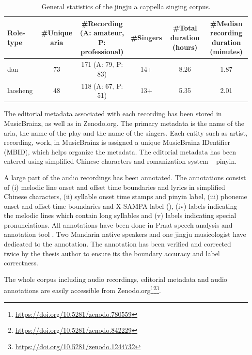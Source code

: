 \begin{landscape}
\mbox{}\vfill
\begin{table}[ht]
    \centering
    \caption{General statistics of the jingju a cappella singing corpus.}
    \label{table:ch4:general_statistics_jingju_a_cappella_corpus}
    \begin{tabular}{l|ccccc}
        \toprule
        Role-type & \#Unique aria & \makecell{\#Recording\\(A: amateur,\\P: professional)} & \#Singers & \makecell{\#Total duration\\(hours)} & \makecell{\#Median recording\\duration (minutes)} \\
        \midrule
        dan           & 73 & 171 (A: 79, P: 83) & 14+ & 8.26 & 1.87 \\
        laosheng      & 48 & 118 (A: 67, P: 51) & 13+ & 5.35 & 2.01 \\
        \bottomrule
    \end{tabular}
\end{table}
\vfill
\end{landscape}

The editorial metadata associated with each recording has been stored in MusicBrainz, as well as in Zenodo.org. The primary metadata is the name of the aria, the name of the play and the name of the singers. Each entity such as artist, recording, work, in MusicBrainz is assigned a unique MusicBrainz IDentifier (MBID), which helps organize the metadata. The editorial metadata has been entered using simplified Chinese characters and romanization system -- pinyin. 

A large part of the audio recordings has been annotated. The annotations consist of (i) melodic line onset and offset time boundaries and lyrics in simplified Chinese characters, (ii) syllable onset time stamps and pinyin label, (iii) phoneme onset and offset time boundaries and \gls{X-SAMPA} label (), (iv) labels indicating the melodic lines which contain long syllables and (v) labels indicating special pronunciations. All annotations have been done in Praat speech analysis and annotation tool \cite{boersma_praat_2001}. Two Mandarin native speakers and one jingju musicologist have dedicated to the annotation. The annotation has been verified and corrected twice by the thesis author to ensure its the boundary accuracy and label correctness.

The whole corpus including audio recordings, editorial metadata and audio annotations are easily accessible from Zenodo.org\footnote{\url{https://doi.org/10.5281/zenodo.780559}}\footnote{\url{https://doi.org/10.5281/zenodo.842229}}\footnote{\url{https://doi.org/10.5281/zenodo.1244732}}.

